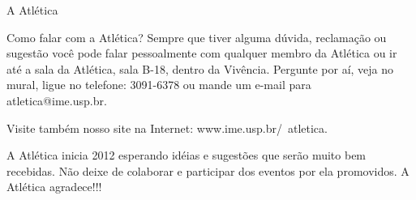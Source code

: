 \begin{secao}{A Atlética}
\begin{subsecao}{Como falar com a Atlética?}
Sempre que tiver alguma dúvida, reclamação ou sugestão você pode falar
pessoalmente com qualquer membro da Atlética ou ir até a sala da Atlética, sala
B-18, dentro da Vivência. Pergunte por aí, veja no mural, ligue no
telefone: 3091-6378 ou mande um e-mail para atletica@ime.usp.br.

Visite também nosso site na Internet: www.ime.usp.br/~atletica.

A Atlética inicia 2012 esperando idéias e sugestões que serão muito bem
recebidas. Não deixe de colaborar e participar dos eventos por ela promovidos.
A Atlética agradece!!!

\end{subsecao}
\end{secao}

